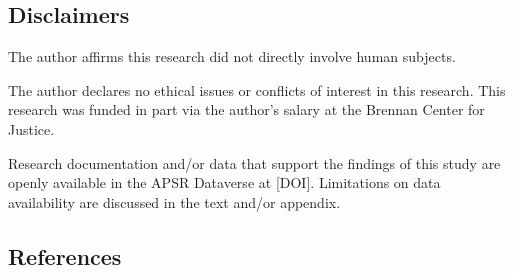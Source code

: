 \documentclass[
  12pt,
]{article}
\begin{document}
\newpage

\hypertarget{disclaimers}{%
\subsection*{Disclaimers}\label{disclaimers}}

The author affirms this research did not directly involve human subjects.

The author declares no ethical issues or conflicts of interest in this research. This research was funded in part via the author's salary at the Brennan Center for Justice.

Research documentation and/or data that support the findings of this study are openly available in the APSR Dataverse at {[}DOI{]}. Limitations on data availability are discussed in the text and/or appendix.

\newpage

\hypertarget{references}{%
\subsection*{References}\label{references}}
\end{document}
